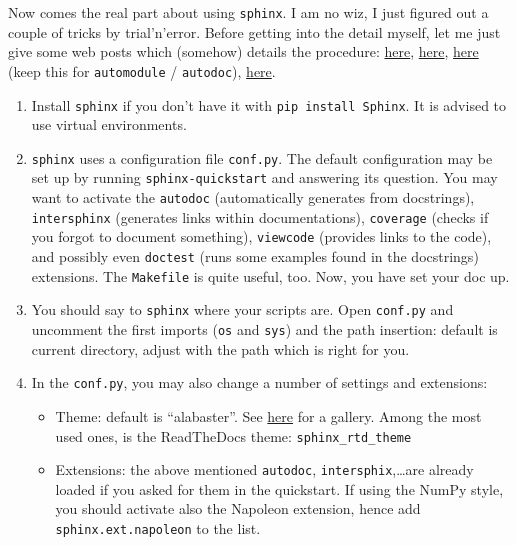 \documentclass[a4paper,12pt,%
              final%
              ]{article}
\begin{document}
Now comes the real part about using \texttt{sphinx}. I am no wiz, I just figured out a couple of tricks by trial'n'error. Before getting into the detail myself, let me just give some web posts which (somehow) details the procedure: \href{https://betterprogramming.pub/auto-documenting-a-python-project-using-sphinx-8878f9ddc6e9}{here}, \href{https://samnicholls.net/2016/06/15/how-to-sphinx-readthedocs/}{here}, \href{https://eikonomega.medium.com/getting-started-with-sphinx-autodoc-part-1-2cebbbca5365}{here} (keep this for \texttt{automodule} / \texttt{autodoc}), \href{https://medium.com/@richdayandnight/a-simple-tutorial-on-how-to-document-your-python-project-using-sphinx-and-rinohtype-177c22a15b5b}{here}.
\begin{enumerate}
  \item Install \texttt{sphinx} if you don't have it with \texttt{pip install Sphinx}. It is advised to use virtual environments.
  \item \texttt{sphinx} uses a configuration file \texttt{conf.py}. The default configuration may be set up by running \texttt{sphinx-quickstart} and answering its question. You may want to activate the \texttt{autodoc} (automatically generates from docstrings), \texttt{intersphinx} (generates links within documentations), \texttt{coverage} (checks if you forgot to document something), \texttt{viewcode} (provides links to the code), and possibly even \texttt{doctest} (runs some examples found in the docstrings) extensions. The \texttt{Makefile} is quite useful, too. Now, you have set your doc up.
  \item You should say to \texttt{sphinx} where your scripts are. Open \texttt{conf.py} and uncomment the first imports (\texttt{os} and \texttt{sys}) and the path insertion: default is current directory, adjust with the path which is right for you.
  \item In the \texttt{conf.py}, you may also change a number of settings and extensions:
    \begin{itemize}
      \item Theme: default is ``alabaster''. See \href{https://sphinx-themes.org/}{here} for a gallery. Among the most used ones, is the ReadTheDocs theme: \verb|sphinx_rtd_theme|
      \item Extensions: the above mentioned \texttt{autodoc}, \texttt{intersphix},\ldots are already loaded if you asked for them in the quickstart. If using the NumPy style, you should activate also the Napoleon extension, hence add \texttt{sphinx.ext.napoleon} to the list.

\end{itemize}
\end{enumerate}
\end{document}
